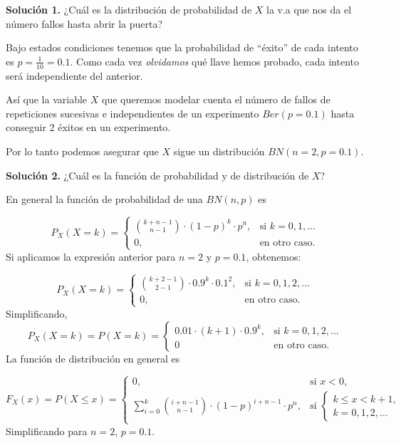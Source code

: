 \documentclass[
  letterpaper,
  DIV=11,
  numbers=noendperiod]{scrreprt}
\begin{document}
\textbf{Solución 1.} ¿Cuál es la distribución de probabilidad de \(X\)
la v.a que nos da el número fallos hasta abrir la puerta?

Bajo estados condiciones tenemos que la probabilidad de ``éxito'' de
cada intento es \(p=\frac{1}{10}=0.1\). Como cada vez \emph{olvidamos}
qué llave hemos probado, cada intento será independiente del anterior.

Así que la variable \(X\) que queremos modelar cuenta el número de
fallos de repeticiones sucesivas e independientes de un experimento
\(Ber(p=0.1)\) hasta conseguir 2 éxitos en un experimento.

Por lo tanto podemos asegurar que \(X\) sigue un distribución
\(BN(n=2,p=0.1).\)

\textbf{Solución 2.} ¿Cuál es la función de probabilidad y de
distribución de \(X\)?

En general la función de probabilidad de una \(BN(n,p)\) es

\[
P_X(X=k)=
\left\{
\begin{array}{cc} 
{k+n-1\choose n-1} \cdot (1-p)^{k}\cdot p^n, & \mbox{si }  k=0,1,\ldots \\ 0, & \mbox{en otro caso.}\end{array}\right.
\] Si aplicamos la expresión anterior para \(n=2\) y \(p=0.1\),
obtenemos:

\[
P_X(X=k)=
\left\{
\begin{array}{cc} 
{k+2-1\choose 2-1} \cdot 0.9^{k}\cdot 0.1^2, & \mbox{si }  k=0,1,2,\ldots \\ 0, & \mbox{en otro caso.}\end{array}\right.
\] Simplificando, \[
P_X(X=k)=P(X=k)=
\left\{
\begin{array}{cc} 
0.01\cdot (k+1)\cdot 0.9^{k}, & \mbox{si }  k=0,1,2,\ldots \\ 0 & \mbox{en otro caso.}\end{array}\right.
\] La función de distribución en general es

\[
F_X(x)=P(X\leq x)=
\left\{
\begin{array}{ll}
0, & \mbox{si } x<0, \\
\displaystyle\sum_{i=0}^{k }{i+n-1\choose n-1} \cdot (1-p)^{i+n-1}\cdot p^n, 
& \mbox{si }\left\{\begin{array}{l} k\leq x< k+1,\\k=0,1,2,\ldots\end{array}\right. 
\end{array}
\right.
\] Simplificando para \(n=2\), \(p=0.1\).
\end{document}
